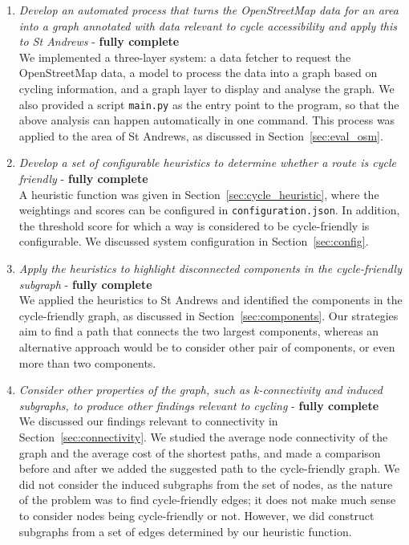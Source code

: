 \documentclass[12pt,a4paper]{report}
\begin{document}
\begin{enumerate}
    \item \textit{Develop an automated process that turns the OpenStreetMap data for an area into a graph annotated with data relevant to cycle accessibility and apply this to St Andrews} - \textbf{fully complete}\\[1mm]
    We implemented a three-layer system: a data fetcher to request the OpenStreetMap data, a model to process the data into a graph based on cycling information, and a graph layer to display and analyse the graph. We also provided a script \texttt{main.py} as the entry point to the program, so that the above analysis can happen automatically in one command. This process was applied to the area of St Andrews, as discussed in Section~\ref{sec:eval_osm}.

    \item \textit{Develop a set of configurable heuristics to determine whether a route is cycle friendly} - \textbf{fully complete}\\[1mm]
    A heuristic function was given in Section~\ref{sec:cycle_heuristic}, where the weightings and scores can be configured in \texttt{configuration.json}. In addition, the threshold score for which a way is considered to be cycle-friendly is configurable. We discussed system configuration in Section~\ref{sec:config}.

    \item \textit{Apply the heuristics to highlight disconnected components in the cycle-friendly subgraph} - \textbf{fully complete}\\[1mm]
    We applied the heuristics to St Andrews and identified the components in the cycle-friendly graph, as discussed in Section~\ref{sec:components}. Our strategies aim to find a path that connects the two largest components, whereas an alternative approach would be to consider other pair of components, or even more than two components.

    \item \textit{Consider other properties of the graph, such as k-connectivity and induced subgraphs, to produce other findings relevant to cycling} - \textbf{fully complete}\\[1mm]
    We discussed our findings relevant to connectivity in Section~\ref{sec:connectivity}. We studied the average node connectivity of the graph and the average cost of the shortest paths, and made a comparison before and after we added the suggested path to the cycle-friendly graph. We did not consider the induced subgraphs from the set of nodes, as the nature of the problem was to find cycle-friendly edges; it does not make much sense to consider nodes being cycle-friendly or not. However, we did construct subgraphs from a set of edges determined by our heuristic function.


\end{enumerate}
\end{document}
